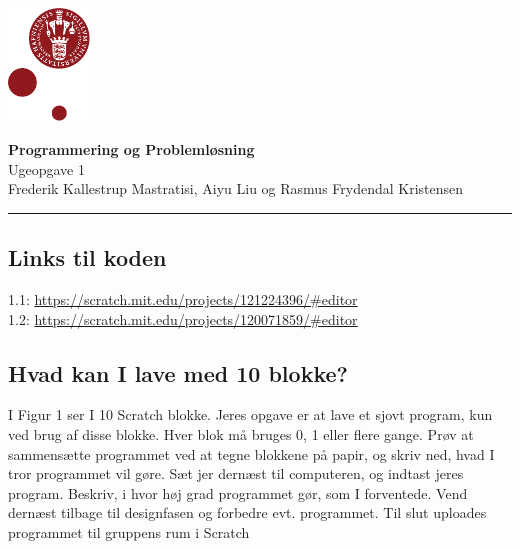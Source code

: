 \documentclass[12pt, a4paper, hidelinks]{article}
\begin{document}
\begin{minipage}[b]{1.0\linewidth}
\includegraphics[height=30mm]{KULogo}

\vspace*{-16ex}
\begin{center}
    {\Large \bf Programmering og Problemløsning} \vspace*{1ex} \\
    {\large Ugeopgave 1} \vspace*{1ex} \\
    {\large Frederik Kallestrup Mastratisi, Aiyu Liu og Rasmus Frydendal Kristensen}
\end{center}
\vspace*{-3pt}
{\color{KU-red}\hrule}
\end{minipage}
\vspace{2ex}

\tableofcontents \newpage

\setcounter{section}{1}
\setcounter{subsection}{-1}



\subsection{Links til koden}

1.1: \url{https://scratch.mit.edu/projects/121224396/#editor} \\

1.2: \url{https://scratch.mit.edu/projects/120071859/#editor} 

\vspace{10mm}





\subsection{Hvad kan I lave med 10 blokke?}

I Figur 1 ser I 10 Scratch blokke. Jeres opgave er at lave et sjovt program, kun ved
brug af disse blokke. Hver blok må bruges 0, 1 eller flere gange. Prøv at sammensætte
programmet ved at tegne blokkene på papir, og skriv ned, hvad I tror programmet
vil gøre. Sæt jer dernæst til computeren, og indtast jeres program. Beskriv, i hvor
høj grad programmet gør, som I forventede. Vend dernæst tilbage til designfasen og
forbedre evt. programmet. Til slut uploades programmet til gruppens rum i Scratch
\end{document}
